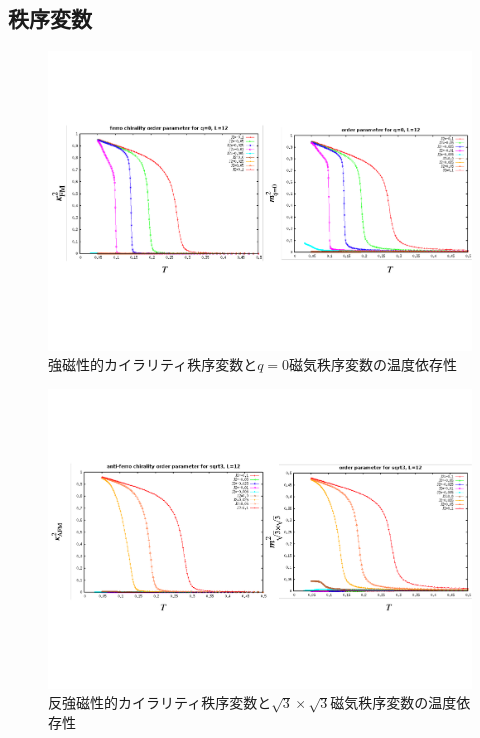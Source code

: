 \documentclass[12pt,titlepage,dvipdfmx]{jarticle}
\begin{document}
\subsection{秩序変数}

\begin{figure}[tbh]
   \centering
   \includegraphics[width=15cm]{figure/order_params_q0.pdf}
   \caption{強磁性的カイラリティ秩序変数と$q=0$磁気秩序変数の温度依存性}
\end{figure}

\begin{figure}[tbh]
   \centering
   \includegraphics[width=15cm]{figure/order_params_sqrt3.pdf}
   \caption{反強磁性的カイラリティ秩序変数と$\sqrt{3}\times\sqrt{3}$磁気秩序変数の温度依存性}
\end{figure}
\end{document}
